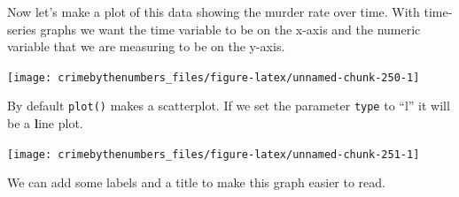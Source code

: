 \documentclass[
]{krantz}
\makeatletter
\newenvironment{Shaded}{\begin{snugshade}}{\end{snugshade}}
\newcommand{\AttributeTok}[1]{\textcolor[rgb]{0.61,0.61,0.61}{#1}}
\newcommand{\FunctionTok}[1]{\textcolor[rgb]{0,0,0}{#1}}
\newcommand{\NormalTok}[1]{#1}
\newcommand{\SpecialCharTok}[1]{\textcolor[rgb]{0,0,0}{#1}}
\newcommand{\StringTok}[1]{\textcolor[rgb]{0.5,0.5,0.5}{#1}}
\newenvironment{kframe}{%
\medskip{}
\setlength{\fboxsep}{.8em}
 \def\at@end@of@kframe{}%
 \ifinner\ifhmode%
  \def\at@end@of@kframe{\end{minipage}}%
  \begin{minipage}{\columnwidth}%
 \fi\fi%
 \def\FrameCommand##1{\hskip\@totalleftmargin \hskip-\fboxsep
 \colorbox{shadecolor}{##1}\hskip-\fboxsep
     \hskip-\linewidth \hskip-\@totalleftmargin \hskip\columnwidth}%
 \MakeFramed {\advance\hsize-\width
   \@totalleftmargin\z@ \linewidth\hsize
   \@setminipage}}%
 {\par\unskip\endMakeFramed%
 \at@end@of@kframe}
\renewenvironment{Shaded}{\begin{kframe}}{\end{kframe}}
\makeatother
\begin{document}
Now let's make a plot of this data showing the murder rate
over time. With time-series graphs we want the time variable
to be on the x-axis and the numeric variable that we are
measuring to be on the y-axis.

\begin{Shaded}
\end{Shaded}

\begin{center}\texttt{[image: crimebythenumbers\_files/figure-latex/unnamed-chunk-250-1]} \end{center}

By default \texttt{plot()} makes a scatterplot. If we set
the parameter \texttt{type} to ``l'' it will be a
\textbf{l}ine plot.

\begin{Shaded}
\end{Shaded}

\begin{center}\texttt{[image: crimebythenumbers\_files/figure-latex/unnamed-chunk-251-1]} \end{center}

We can add some labels and a title to make this graph easier
to read.

\begin{Shaded}
\end{Shaded}
\end{document}
